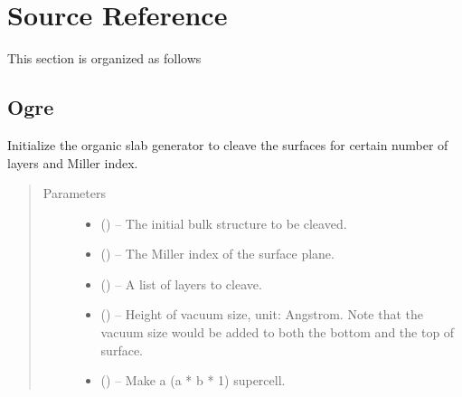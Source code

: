 \documentclass[letterpaper,10pt,english,openany,oneside]{sphinxmanual}
\begin{document}
\chapter{Source Reference}
\label{\detokenize{index:source-reference}}
This section is organized as follows


\section{Ogre}
\label{\detokenize{index:id2}}

\begin{fulllineitems}
\label{\detokenize{index:ogre.generators.OrganicSlabGenerator}}
Initialize the organic slab generator to cleave the surfaces for
certain number of layers and Miller index.
\begin{quote}\begin{description}
\item[{Parameters}] \leavevmode\begin{itemize}
\item {} 
 () -- The initial bulk structure to be cleaved.

\item {} 
 () -- The Miller index of the surface plane.

\item {} 
 () -- A list of layers to cleave.

\item {} 
 () -- Height of vacuum size, unit: Angstrom. Note that the vacuum size
would be added to both the bottom and the top of surface.

\item {} 
 () -- Make a (a * b * 1) supercell.


\end{itemize}
\end{description}
\end{quote}
\end{fulllineitems}
\end{document}
